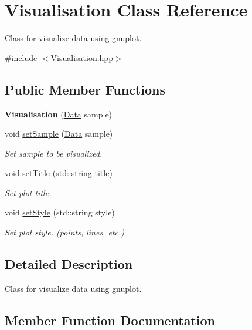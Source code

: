 \hypertarget{class_visualisation}{}\section{Visualisation Class Reference}
\label{class_visualisation}


Class for visualize data using gnuplot.  




{\ttfamily \#include $<$Visualisation.\+hpp$>$}

\subsection*{Public Member Functions}
\begin{DoxyCompactItemize}
\item 
\mbox{\label{class_visualisation_afefd794a5388f8e03608ca7583443b6b}} 
{\bfseries Visualisation} (\hyperlink{class_data}{Data} sample)
\item 
void \hyperlink{class_visualisation_a124977561c36f63108795e849ad0f100}{set\+Sample} (\hyperlink{class_data}{Data} sample)
\begin{DoxyCompactList}\small\item\em Set sample to be visualized. \end{DoxyCompactList}\item 
void \hyperlink{class_visualisation_ac217fcae4984edeb003bfcd208a253de}{set\+Title} (std\+::string title)
\begin{DoxyCompactList}\small\item\em Set plot title. \end{DoxyCompactList}\item 
void \hyperlink{class_visualisation_a2d29fee9180bcb2fd5cb6fc78253ac5b}{set\+Style} (std\+::string style)
\begin{DoxyCompactList}\small\item\em Set plot style. (points, lines, etc.) \end{DoxyCompactList}\end{DoxyCompactItemize}


\subsection{Detailed Description}
Class for visualize data using gnuplot. 

\subsection{Member Function Documentation}
\mbox{\label{class_visualisation_a124977561c36f63108795e849ad0f100}} 
